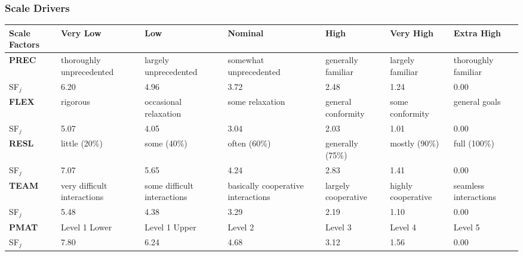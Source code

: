 \subsubsection{Scale Drivers}

\hspace*{-3cm}\begin{tabular}{|p{3cm}|p{2cm}|p{2cm}|p{2cm}|p{2cm}|p{2cm}|p{2cm}|}
	\hline
	\textbf{Scale Factors} & \textbf{Very Low} & \textbf{Low} & \textbf{Nominal} & \textbf{High} & \textbf{Very High} & \textbf{Extra High}\\
	\hline
	\textbf{PREC} & thoroughly unprecedented & largely unprecedented & somewhat unprecedented & generally familiar & largely familiar & thoroughly familiar\\
	SF$_j$ & 6.20 & 4.96 & 3.72 & 2.48 & 1.24 & 0.00\\\hline
	\textbf{FLEX} & rigorous & occasional relaxation & some relaxation & general conformity & some conformity & general goals\\
	SF$_j$ & 5.07 & 4.05 & 3.04 & 2.03 & 1.01 & 0.00\\\hline
	\textbf{RESL} & little (20\%) & some (40\%) & often (60\%) & generally (75\%) & mostly (90\%) & full (100\%)\\
	SF$_j$ & 7.07 & 5.65 & 4.24 & 2.83 & 1.41 & 0.00\\\hline
	\textbf{TEAM} & very difficult interactions & some difficult interactions & basically cooperative interactions & largely cooperative & highly cooperative & seamless interactions\\
	SF$_j$ & 5.48 & 4.38 & 3.29 & 2.19 & 1.10 & 0.00\\\hline
	\textbf{PMAT} & Level 1 Lower & Level 1 Upper & Level 2 & Level 3 & Level 4 & Level 5\\
	SF$_j$ & 7.80 & 6.24 & 4.68 & 3.12 & 1.56 & 0.00\\\hline
\end{tabular}

